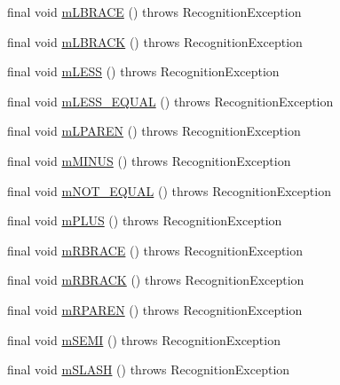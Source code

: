 \begin{DoxyCompactItemize}
final void \hyperlink{classorg_1_1tzi_1_1use_1_1parser_1_1soil_1_1_soil_lexer_af9abf1e61864396d4df68dea92999bcc}{m\-L\-B\-R\-A\-C\-E} ()  throws Recognition\-Exception 
\item 
final void \hyperlink{classorg_1_1tzi_1_1use_1_1parser_1_1soil_1_1_soil_lexer_a08ab298b57fdbaef97c263585df35ba8}{m\-L\-B\-R\-A\-C\-K} ()  throws Recognition\-Exception 
\item 
final void \hyperlink{classorg_1_1tzi_1_1use_1_1parser_1_1soil_1_1_soil_lexer_a35dcc7f54f291055d6addc1cae2451fa}{m\-L\-E\-S\-S} ()  throws Recognition\-Exception 
\item 
final void \hyperlink{classorg_1_1tzi_1_1use_1_1parser_1_1soil_1_1_soil_lexer_a51b9a3708938bbbcc3b51f3385a023e6}{m\-L\-E\-S\-S\-\_\-\-E\-Q\-U\-A\-L} ()  throws Recognition\-Exception 
\item 
final void \hyperlink{classorg_1_1tzi_1_1use_1_1parser_1_1soil_1_1_soil_lexer_a858181b2ecb1e9228e0cf6137484381d}{m\-L\-P\-A\-R\-E\-N} ()  throws Recognition\-Exception 
\item 
final void \hyperlink{classorg_1_1tzi_1_1use_1_1parser_1_1soil_1_1_soil_lexer_a3f186af385a38b885adc8b95a0ba8409}{m\-M\-I\-N\-U\-S} ()  throws Recognition\-Exception 
\item 
final void \hyperlink{classorg_1_1tzi_1_1use_1_1parser_1_1soil_1_1_soil_lexer_a4af325838eb709a7b78940676da1c36e}{m\-N\-O\-T\-\_\-\-E\-Q\-U\-A\-L} ()  throws Recognition\-Exception 
\item 
final void \hyperlink{classorg_1_1tzi_1_1use_1_1parser_1_1soil_1_1_soil_lexer_a406216eddfea7fbd56c0fcf8331cb61b}{m\-P\-L\-U\-S} ()  throws Recognition\-Exception 
\item 
final void \hyperlink{classorg_1_1tzi_1_1use_1_1parser_1_1soil_1_1_soil_lexer_a87fa7056ecc49d87fc6b288a91f14ae2}{m\-R\-B\-R\-A\-C\-E} ()  throws Recognition\-Exception 
\item 
final void \hyperlink{classorg_1_1tzi_1_1use_1_1parser_1_1soil_1_1_soil_lexer_aeb787be17ecb820f329e436b955eb7e4}{m\-R\-B\-R\-A\-C\-K} ()  throws Recognition\-Exception 
\item 
final void \hyperlink{classorg_1_1tzi_1_1use_1_1parser_1_1soil_1_1_soil_lexer_ac8048de344a72e02498102568be440dd}{m\-R\-P\-A\-R\-E\-N} ()  throws Recognition\-Exception 
\item 
final void \hyperlink{classorg_1_1tzi_1_1use_1_1parser_1_1soil_1_1_soil_lexer_a9eec332cb3c3861a9fcb8834bc756d36}{m\-S\-E\-M\-I} ()  throws Recognition\-Exception 
\item 
final void \hyperlink{classorg_1_1tzi_1_1use_1_1parser_1_1soil_1_1_soil_lexer_a1b22078a614e527ed7963a7ea58c655b}{m\-S\-L\-A\-S\-H} ()  throws Recognition\-Exception 

\end{DoxyCompactItemize}
